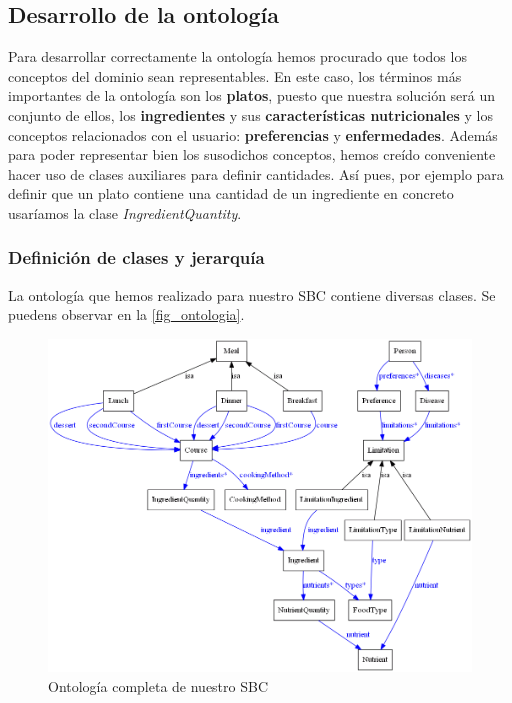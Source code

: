 \documentclass[12]{article}
\begin{document}
\subsection{Desarrollo de la ontología}
Para desarrollar correctamente la ontología hemos procurado que todos los conceptos del dominio sean representables. En este caso, los términos más importantes de la ontología son los \textbf{platos}, puesto que nuestra solución será un conjunto de ellos, los \textbf{ingredientes} y sus \textbf{características nutricionales} y los conceptos relacionados con el usuario: \textbf{preferencias} y \textbf{enfermedades}. Además para poder representar bien los susodichos conceptos, hemos creído conveniente hacer uso de clases auxiliares para definir cantidades. Así pues, por ejemplo para definir que un plato contiene una cantidad de un ingrediente en concreto usaríamos la clase \textit{IngredientQuantity}.
\label{ontologia_apartado}
\subsubsection{Definición de clases y jerarquía}

La ontología que hemos realizado para nuestro SBC contiene diversas clases. Se puedens observar en la \autoref{fig_ontologia}.

\begin{figure}[H]
\centering
\includegraphics[width=\textwidth,height=\textheight,keepaspectratio]{images/full_light.png}
\caption{Ontología completa de nuestro SBC}
\label{fig_ontologia}
\end{figure}
\end{document}
